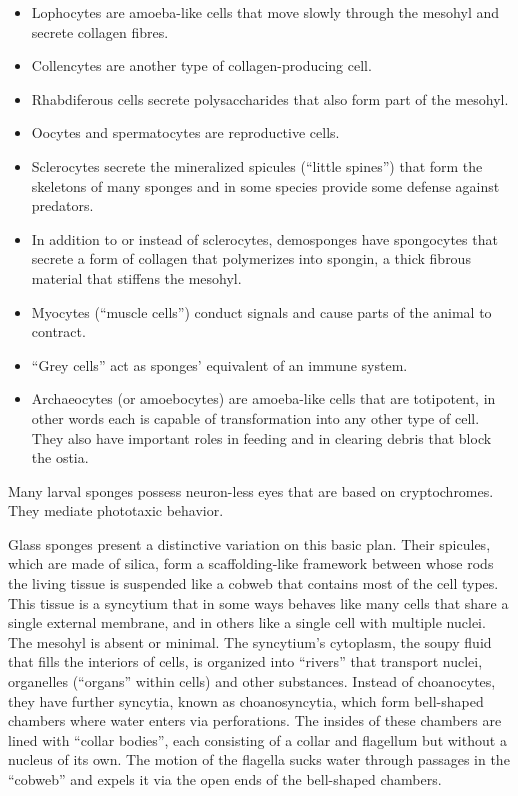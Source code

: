 \begin{itemize}
\tightlist
\item
  Lophocytes are amoeba-like cells that move slowly through the mesohyl and secrete collagen fibres.
\item
  Collencytes are another type of collagen-producing cell.
\item
  Rhabdiferous cells secrete polysaccharides that also form part of the mesohyl.
\item
  Oocytes and spermatocytes are reproductive cells.
\item
  Sclerocytes secrete the mineralized spicules (``little spines'') that form the skeletons of many sponges and in some species provide some defense against predators.
\item
  In addition to or instead of sclerocytes, demosponges have spongocytes that secrete a form of collagen that polymerizes into spongin, a thick fibrous material that stiffens the mesohyl.
\item
  Myocytes (``muscle cells'') conduct signals and cause parts of the animal to contract.
\item
  ``Grey cells'' act as sponges' equivalent of an immune system.
\item
  Archaeocytes (or amoebocytes) are amoeba-like cells that are totipotent, in other words each is capable of transformation into any other type of cell. They also have important roles in feeding and in clearing debris that block the ostia.
\end{itemize}

Many larval sponges possess neuron-less eyes that are based on cryptochromes. They mediate phototaxic behavior.

Glass sponges present a distinctive variation on this basic plan. Their spicules, which are made of silica, form a scaffolding-like framework between whose rods the living tissue is suspended like a cobweb that contains most of the cell types. This tissue is a syncytium that in some ways behaves like many cells that share a single external membrane, and in others like a single cell with multiple nuclei. The mesohyl is absent or minimal. The syncytium's cytoplasm, the soupy fluid that fills the interiors of cells, is organized into ``rivers'' that transport nuclei, organelles (``organs'' within cells) and other substances. Instead of choanocytes, they have further syncytia, known as choanosyncytia, which form bell-shaped chambers where water enters via perforations. The insides of these chambers are lined with ``collar bodies'', each consisting of a collar and flagellum but without a nucleus of its own. The motion of the flagella sucks water through passages in the ``cobweb'' and expels it via the open ends of the bell-shaped chambers.

